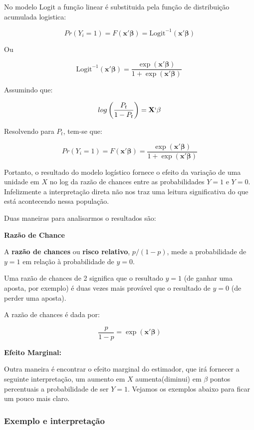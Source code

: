 \documentclass[
  letterpaper,
  DIV=11,
  numbers=noendperiod]{scrreprt}
\begin{document}
No modelo Logit a função linear é substituida pela função de
distribuição acumulada logistica:

\[ Pr(Y_i=1)=F(\mathbf{x}'\boldsymbol{\beta})=\text{Logit}^{-1}(\mathbf{x}'\boldsymbol{\beta})\]

Ou

\[\text{Logit}^{-1}(\mathbf{x}'\boldsymbol{\beta}) = \frac{\exp(\mathbf{x}'\boldsymbol{\beta})}{1 + \exp(\mathbf{x}'\boldsymbol{\beta})}
\ \]

Assumindo que:

\[log \left( \frac{P_t}{1-P_t}\right)=\mathbf{X}`\beta\]

Resolvendo para \(P_t\), tem-se que:

\[ Pr(Y_i=1)=F(\mathbf{x}'\boldsymbol{\beta}) = \frac{\exp(\mathbf{x}'\boldsymbol{\beta})}{1 + \exp(\mathbf{x}'\boldsymbol{\beta})}\]

Portanto, o resultado do modelo logístico fornece o efeito da variação
de uma unidade em \(X\) no log da razão de chances entre as
probabilidades \(Y=1\) e \(Y=0\). Infelizmente a interpretação direta
não nos traz uma leitura significativa do que está acontecendo nessa
população.

Duas maneiras para analisarmos o resultados são:

\textbf{Razão de Chance}

A \textbf{razão de chances} ou \textbf{risco relativo}, \(p/(1-p)\),
mede a probabilidade de \(y=1\) em relação à probabilidade de \(y=0\).

Uma razão de chances de 2 significa que o resultado \(y=1\) (de ganhar
uma aposta, por exemplo) é duas vezes mais provável que o resultado de
\(y=0\) (de perder uma aposta).

A razão de chances é dada por:

\[\frac{p}{1 - p} = \exp(\mathbf{x}' \boldsymbol{\beta})\]

\textbf{Efeito Marginal:}

Outra maneira é encontrar o efeito marginal do estimador, que irá
fornecer a seguinte interpretação, um aumento em \(X\) aumenta(diminui)
em \(\beta\) pontos percentuais a probabilidade de ser \(Y=1\). Vejamos
os exemplos abaixo para ficar um pouco mais claro.

\subsubsection{Exemplo e
interpretação}\label{exemplo-e-interpretauxe7uxe3o}
\end{document}
